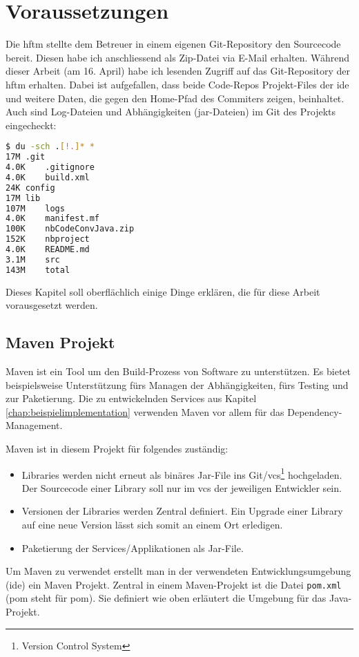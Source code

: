 \chapter{Voraussetzungen}
Die \acrshort{hftm} stellte dem Betreuer in einem eigenen Git-Repository den Sourcecode bereit. Diesen habe ich anschliessend als Zip-Datei via E-Mail erhalten. Während dieser Arbeit (am 16. April) habe ich lesenden Zugriff auf das Git-Repository der \acrshort{hftm} erhalten\cite{gitlab.com/solidus/hefei}. Dabei ist aufgefallen, dass beide Code-Repos Projekt-Files der \acrshort{ide} und weitere Daten, die gegen den Home-Pfad des Commiters zeigen, beinhaltet. Auch sind Log-Dateien und Abhängigkeiten (jar-Dateien) im Git des Projekts eingecheckt:
\begin{lstlisting}[caption={Listing der Daten im Git-Repository 'gitlab.com/solidus/hefei'},language=Bash, columns=fixed]
$ du -sch .[!.]* *
17M	.git
4.0K	.gitignore
4.0K	build.xml
24K	config
17M	lib
107M	logs
4.0K	manifest.mf
100K	nbCodeConvJava.zip
152K	nbproject
4.0K	README.md
3.1M	src
143M	total
\end{lstlisting}
Dieses Kapitel soll oberflächlich einige Dinge erklären, die für diese Arbeit vorausgesetzt werden.
\section{Maven Projekt}
Maven ist ein Tool um den Build-Prozess von Software zu unterstützen. Es bietet beispielsweise Unterstützung fürs Managen der Abhängigkeiten, fürs Testing und zur Paketierung. Die zu entwickelnden Services aus Kapitel \ref{chap:beispielimplementation} verwenden Maven vor allem für das Dependency-Management.

Maven ist in diesem Projekt für folgendes zuständig:
\begin{itemize}
	\item
	Libraries werden nicht erneut als binäres Jar-File ins Git/\acrshort{vcs}\footnote{Version Control System} hochgeladen. Der Sourcecode einer Library soll nur im \acrshort{vcs} der jeweiligen Entwickler sein.
	\item
	Versionen der Libraries werden Zentral definiert. Ein Upgrade einer Library auf eine neue Version lässt sich somit an einem Ort erledigen.
	\item
	Paketierung der Services/Applikationen als Jar-File.
\end{itemize}
Um Maven zu verwendet erstellt man in der verwendeten Entwicklungsumgebung (\acrshort{ide}) ein Maven Projekt. Zentral in einem Maven-Projekt ist die Datei \verb|pom.xml| (\acrshort{pom} steht für \acrlong{pom}). Sie definiert wie oben erläutert die Umgebung für das Java-Projekt.

